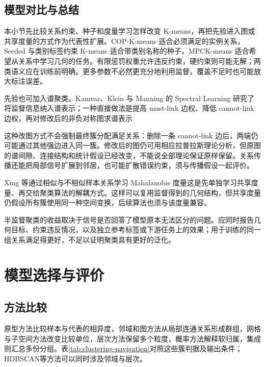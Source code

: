 \subsection{模型对比与总结}

本小节先比较关系约束、种子和度量学习怎样改变 K-means，再把先验进入图或共享度量的方式作为代表性扩展。COP-K-means 适合必须满足的实例关系，Seeded 与类别标签约束 K-means 适合带类别名称的种子，MPCK-means 适合希望从关系中学习几何的任务。有限惩罚权重允许违反约束，硬约束则可能无解；两类语义应在训练前明确。更多参数不必然更充分地利用监督，覆盖不足时也可能放大标注误差。

先验也可加入谱聚类。Kamvar、Klein 与 Manning 的 Spectral Learning 研究了将监督信息纳入谱表示；一种直接做法是提高 must-link 边权、降低 cannot-link 边权，再对修改后的非负对称图求谱表示

这种改图方式不会强制最终簇分配满足关系：删除一条 cannot-link 边后，两端仍可能通过其他强边进入同一簇。修改后的图仍可用相应拉普拉斯理论分析，但原图的谱间隙、连接结构和统计假设已经改变，不能说全部理论保证原样保留。关系传播还能把局部信号扩展到邻居，也可能扩散错误约束，须与传播假设一起评价。

Xing 等通过相似与不相似样本关系学习 Mahalanobis 度量这是先单独学习共享度量、再交给聚类算法的解耦方式。这样可以复用监督得到的几何结构，但共享度量仍假设所有簇使用同一种空间变换，后续算法也须与该度量兼容。

半监督聚类的收益取决于信号是否回答了模型原本无法区分的问题。应同时报告几何目标、约束违反情况，以及独立参考标签或下游任务上的效果；用于训练的同一组关系满足得更好，不足以证明聚类具有更好的泛化。

\section{模型选择与评价}
\label{sec:clustering-evaluation}

\subsection{方法比较}

原型方法比较样本与代表的相异度，邻域和图方法从局部连通关系形成群组，网格与子空间方法改变比较单位，层次方法保留多个粒度，概率方法解释软归属，集成则汇总多份分组。表\ref{tab:clustering-navigation}对照这些簇判据及输出条件；HDBSCAN等方法可以同时涉及邻域与层次。

